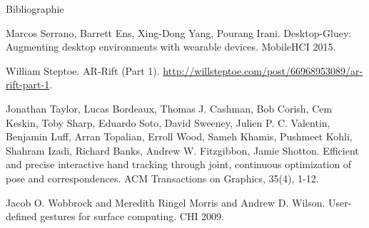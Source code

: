 \begin{frame}[allowframebreaks]{Bibliographie}
\begin{thebibliography}{10}
      Marcos Serrano, Barrett Ens, Xing-Dong Yang, Pourang Irani.
      \newblock Desktop-Gluey: Augmenting desktop environments with wearable devices.
      \newblock MobileHCI 2015.

      William Steptoe.
      \newblock AR-Rift (Part 1).
      \newblock \url{http://willsteptoe.com/post/66968953089/ar-rift-part-1}.

      Jonathan Taylor, Lucas Bordeaux, Thomas J. Cashman, Bob Corish, Cem Keskin, Toby Sharp, Eduardo Soto, David Sweeney, Julien P. C. Valentin, Benjamin Luff, Arran Topalian, Erroll Wood, Sameh Khamis, Pushmeet Kohli, Shahram Izadi, Richard Banks, Andrew W. Fitzgibbon, Jamie Shotton.
      \newblock Efficient and precise interactive hand tracking through joint, continuous optimization of pose and correspondences.
      \newblock ACM Transactions on Graphics, 35(4), 1-12.

      Jacob O. Wobbrock and Meredith Ringel Morris and Andrew D. Wilson.
      \newblock User-defined gestures for surface computing.
      \newblock CHI 2009.
  \end{thebibliography}
\end{frame}